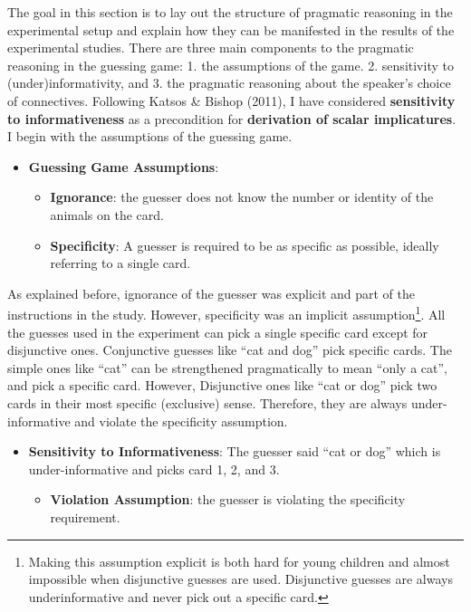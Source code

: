 \documentclass[oneside]{report}
\theoremstyle{definition}
\theoremstyle{definition}
\theoremstyle{definition}
\theoremstyle{remark}
\begin{document}
The goal in this section is to lay out the structure of pragmatic
reasoning in the experimental setup and explain how they can be
manifested in the results of the experimental studies. There are three
main components to the pragmatic reasoning in the guessing game: 1. the
assumptions of the game. 2. sensitivity to (under)informativity, and 3.
the pragmatic reasoning about the speaker's choice of connectives.
Following Katsos \& Bishop (2011), I have considered \textbf{sensitivity
to informativeness} as a precondition for \textbf{derivation of scalar
implicatures}. I begin with the assumptions of the guessing game.
\begin{itemize}
\tightlist
\item
  \textbf{Guessing Game Assumptions}:
  \begin{itemize}
  \tightlist
  \item
    \textbf{Ignorance}: the guesser does not know the number or identity
    of the animals on the card.
  \item
    \textbf{Specificity}: A guesser is required to be as specific as
    possible, ideally referring to a single card.
  \end{itemize}
\end{itemize}
As explained before, ignorance of the guesser was explicit and part of
the instructions in the study. However, specificity was an implicit
assumption\footnote{Making this assumption explicit is both hard for
  young children and almost impossible when disjunctive guesses are
  used. Disjunctive guesses are always underinformative and never pick
  out a specific card.}. All the guesses used in the experiment can pick
a single specific card except for disjunctive ones. Conjunctive guesses
like ``cat and dog'' pick specific cards. The simple ones like ``cat''
can be strengthened pragmatically to mean ``only a cat'', and pick a
specific card. However, Disjunctive ones like ``cat or dog'' pick two
cards in their most specific (exclusive) sense. Therefore, they are
always under-informative and violate the specificity assumption.
\begin{itemize}
\tightlist
\item
  \textbf{Sensitivity to Informativeness}: The guesser said ``cat or
  dog'' which is under-informative and picks card 1, 2, and 3.
  \begin{itemize}
  \tightlist
  \item
    \textbf{Violation Assumption}: the guesser is violating the
    specificity requirement.
  \end{itemize}
\end{itemize}
\end{document}
